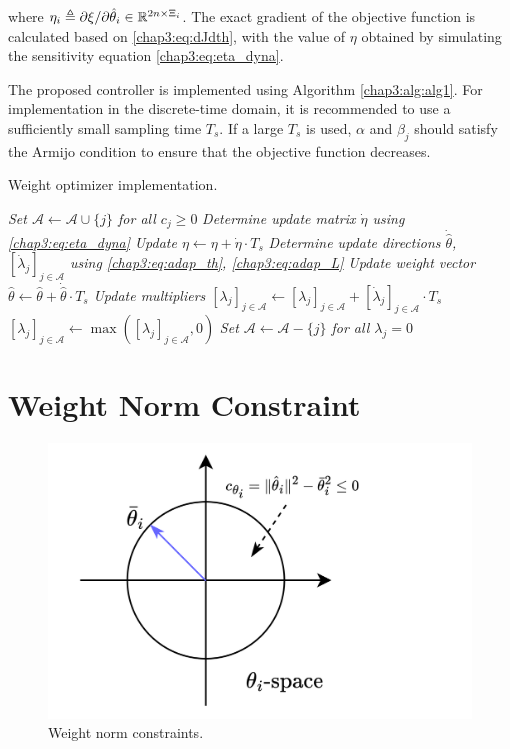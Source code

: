 where $\eta_i \triangleq \partial \xi/\partial \hat\theta_i\in\mathbb{R}^{2n\times \Xi_i}$. 
The exact gradient of the objective function is calculated based on \eqref{chap3:eq:dJdth}, with the value of $\eta$ obtained by simulating the sensitivity equation \eqref{chap3:eq:eta_dyna}.

The proposed controller is implemented using Algorithm \ref{chap3:alg:alg1}. 
For implementation in the discrete-time domain, it is recommended to use a sufficiently small sampling time $T_s$. 
If a large $T_s$ is used, $\alpha$ and $\beta_j$ should satisfy the Armijo condition \cite[Chap.~3 eq.~(3.4)]{RN9} to ensure that the objective function decreases.

\begin{algorithm}[t]
    \caption{Weight optimizer implementation.}\label{chap3:alg:alg1}
        \BlankLine
        \emph{Set $\mathcal A \leftarrow \mathcal A\cup \{j\}$ for all $c_j\ge0$}\;
        \emph{Determine update matrix $\dot\eta$ using \eqref{chap3:eq:eta_dyna}}\;
        \emph{Update $\eta\leftarrow \eta +\dot\eta\cdot T_s$}\; 
        \emph{Determine update directions $\dot{\hat\theta}$, $[\dot\lambda_j]_{j\in\mathcal A}$ using \eqref{chap3:eq:adap_th}, \eqref{chap3:eq:adap_L}}\;
        \emph{Update weight vector $\hat\theta\leftarrow \hat\theta+\dot{\hat\theta}\cdot T_s$}\;
        \emph{Update multipliers $[\lambda_j]_{j\in\mathcal A}\leftarrow [\lambda_j]_{j\in\mathcal A}+[\dot\lambda_j]_{j\in\mathcal A}\cdot T_s$}\;
        \emph{$[\lambda_j]_{j\in\mathcal A}\leftarrow \max([\lambda_j]_{j\in\mathcal A}, 0)$}\;
        \emph{Set $\mathcal A \leftarrow \mathcal A - \{j\}$ for all $\lambda_j=0$}\;
\end{algorithm}

\section{Weight Norm Constraint} \label{chap3:sec:weight_cstr}

\begin{figure}[t]
  \centering
  \includegraphics[width=0.5\linewidth]{imgs/cstr_weight.drawio.png}
  \caption{Weight norm constraints.}
  \label{chap3:fig:cstr:weight}
\end{figure}

